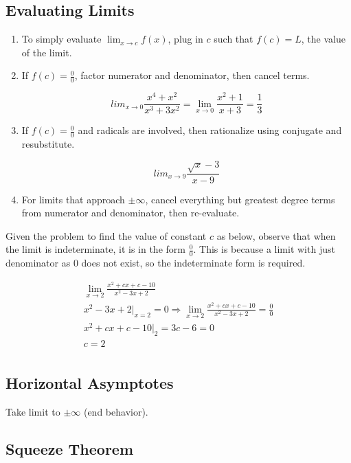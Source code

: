 \subsection{Evaluating Limits}\label{subsec:evaluating-limits}

\begin{enumerate}
    \item To simply evaluate $\lim_{x\to{c}}f(x)$, 
    plug in $c$ such that $f(c)=L$, the value of the limit.

    \item If $f(c)=\frac{0}{0}$, factor numerator and denominator, then cancel terms.
    
    \[lim_{x\to{0}}\frac{x^4+x^2}{x^3+3x^2}=
        \lim_{x\to{0}}\frac{x^2+1}{x+3}=\frac{1}{3}\]

    \item If $f(c)=\frac{0}{0}$ and radicals are involved, 
    then rationalize using conjugate and resubstitute.
                  
    \[lim_{x\to{9}}\frac{\sqrt{x}-3}{x-9}\]

    \item For limits that approach $\pm{\infty}$, cancel everything but 
    greatest degree terms from numerator and denominator, then re-evaluate.
\end{enumerate}

Given the problem to find the value of constant $c$ as below, observe that
when the limit is indeterminate, it is in the form $\frac{0}{0}$.
This is because a limit with just denominator as $0$ does not exist, so 
the indeterminate form is required.

\begin{gather*}
    \lim_{x\to{2}}\frac{x^2+cx+c-10}{x^2-3x+2}\\
    x^2-3x+2\vert_{x=2}=0\Rightarrow \lim_{x\to{2}}\frac{x^2+cx+c-10}{x^2-3x+2}=\frac{0}{0}\\
    x^2+cx+c-10\vert_2=3c-6=0\\
    c=2\\
\end{gather*}

\subsection{Horizontal Asymptotes}\label{subsec:horizontal-asymptotes}

Take limit to $\pm \infty$ (end behavior).

\subsection{Squeeze Theorem}\label{subsec:squeeze-theorem}

